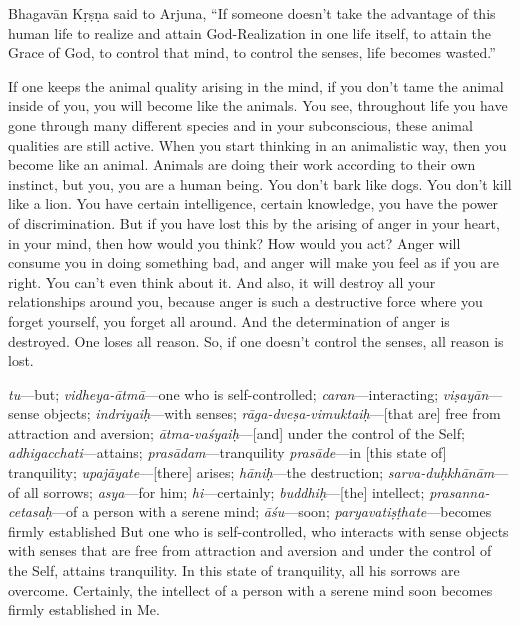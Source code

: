Bhagavān Kṛṣṇa said to Arjuna, “If someone doesn’t take the advantage of this human life to realize and attain God-Realization in one life itself, to attain the Grace of God, to control that mind, to control the senses, life becomes wasted.”

If one keeps the animal quality arising in the mind, if you don’t tame the animal inside of you, you will become like the animals. You see, throughout life you have gone through many different species and in your subconscious, these animal qualities are still active. When you start thinking in an animalistic way, then you become like an animal. Animals are doing their work according to their own instinct, but you, you are a human being. You don’t bark like dogs. You don’t kill like a lion. You have certain intelligence, certain knowledge, you have the power of discrimination. But if you have lost this by the arising of anger in your heart, in your mind, then how would you think? How would you act? Anger will consume you in doing something bad, and anger will make you feel as if you are right. You can’t even think about it. And also, it will destroy all your relationships around you, because anger is such a destructive force where you forget yourself, you forget all around. And the determination of anger is destroyed. One loses all reason. So, if one doesn’t control the senses, all reason is lost.

{%
  \textit{tu}---but; 
  \textit{vidheya-ātmā}---one who is self-controlled; 
  \textit{caran}---interacting; 
  \textit{viṣayān}---sense objects; 
  \textit{indriyaiḥ}---with senses; 
  \textit{rāga-dveṣa-vimuktaiḥ}---[that are] free from attraction and aversion; 
  \textit{ātma-vaśyaiḥ}---[and] under the control of the Self; 
  \textit{adhigacchati}---attains; 
  \textit{prasādam}---tranquility
  \textit{prasāde}---in [this state of] tranquility; 
  \textit{upajāyate}---[there] arises; 
  \textit{hāniḥ}---the destruction; 
  \textit{sarva-duḥkhānām}---of all sorrows; 
  \textit{asya}---for him; 
  \textit{hi}---certainly; 
  \textit{buddhiḥ}---[the] intellect; 
  \textit{prasanna-cetasaḥ}---of a person with a serene mind; 
  \textit{āśu}---soon; 
  \textit{paryavatiṣṭhate}---becomes firmly established
}
{%
  But one who is self-controlled, who interacts with sense objects with senses that are free from attraction and aversion and under the control of the Self, attains tranquility. In this state of tranquility, all his sorrows are overcome. Certainly, the intellect of a person with a serene mind soon becomes firmly established in Me.
}

